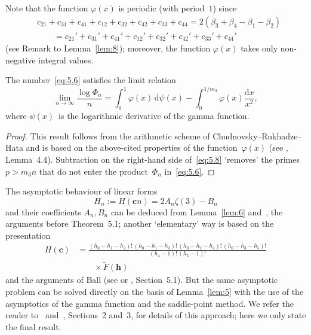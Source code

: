 \documentclass[a4paper,twoside]{article}
\numberwithin{equation}{section}
\renewcommand{\[}{\lfloor}
\renewcommand{\]}{\rfloor}
\newcommand{\<}{\langle}
\renewcommand{\>}{\rangle}
\renewcommand{\phi}{\varphi}
\renewcommand{\d}{\mathrm{d}}
\newcommand{\wt}{\widetilde}
\newcommand{\bc}{\boldsymbol c}
\newcommand{\bh}{\boldsymbol h}
\begin{document}
Note that the function $\phi(x)$ is periodic (with period~$1$)
since
\begin{align*}
&
c_{21}+c_{31}+c_{41}+c_{12}+c_{32}+c_{42}+c_{33}+c_{44}
=2(\beta_3+\beta_4-\beta_1-\beta_2)
\\ &\qquad
=c_{21}'+c_{31}'+c_{41}'+c_{12}'+c_{32}'+c_{42}'+c_{33}'+c_{44}'
\end{align*}
(see Remark to Lemma~\ref{lem:8});
moreover, the function $\phi(x)$
takes only non-negative integral values.

\begin{lemma}
\label{lem:11}
The number~\eqref{eq:5.6} satisfies the limit relation
\begin{equation}
\lim_{n\to\infty}\frac{\log\Phi_n}n
=\int_0^1\phi(x)\,\d\psi(x)-\int_0^{1/m_3}\phi(x)\frac{\d x}{x^2},
\label{eq:5.8}
\end{equation}
where $\psi(x)$~is the logarithmic derivative of the gamma function.
\end{lemma}

\begin{proof}
This result follows from the arithmetic scheme
of Chudnovsky--Rukha\-dze--Hata
and is based on the above-cited properties of the function~$\phi(x)$
(see \cite{Zu3}, Lemma~4.4). Subtraction on the right-hand side
of~\eqref{eq:5.8} `removes' the primes $p>m_3n$ that do not enter
the product~$\Phi_n$ in~\eqref{eq:5.6}.
\end{proof}

The asymptotic behaviour of linear forms
$$
H_n:=H(\bc n)=2A_n\zeta(3)-B_n
$$
and their coefficients $A_n,B_n$ can be deduced from
Lemma~\ref{lem:6} and~\cite{RV3}, the arguments before Theorem~5.1;
another `elementary' way is based on the presentation
\begin{align}
H(\bc)
&=\frac{(h_0-h_1-h_2)!\,(h_0-h_1-h_3)!\,(h_0-h_2-h_4)!\,(h_0-h_3-h_5)!}
{(h_4-1)!\,(h_5-1)!}
\nonumber\\ &\qquad\times %
\wt F(\bh)
\label{eq:5.9}
\end{align}
and the arguments of Ball (see \cite{BR} or \cite{Ri3}, Section~5.1).
But the same asymptotic problem can be solved directly
on the basis of Lemma~\ref{lem:5} with the use of the asymptotics of the gamma
function and the saddle-point method. We refer the reader to~\cite{Ne1}
and~\cite{Zu3}, Sections~2 and~3, for details of this approach;
here we only state the final result.
\end{document}
